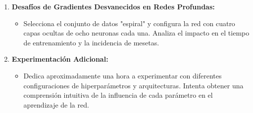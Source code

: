 \documentclass[11pt]{article}
\begin{document}
\begin{enumerate}
\item \textbf{\textbf{Desafíos de Gradientes Desvanecidos en Redes Profundas:}}
\begin{itemize}
\item Selecciona el conjunto de datos "espiral" y configura la red con
cuatro capas ocultas de ocho neuronas cada una. Analiza el
impacto en el tiempo de entrenamiento y la incidencia de mesetas.
\end{itemize}

\item \textbf{\textbf{Experimentación Adicional:}}
\begin{itemize}
\item Dedica aproximadamente una hora a experimentar con diferentes
configuraciones de hiperparámetros y arquitecturas. Intenta
obtener una comprensión intuitiva de la influencia de cada
parámetro en el aprendizaje de la red.
\end{itemize}
\end{enumerate}
\end{document}
